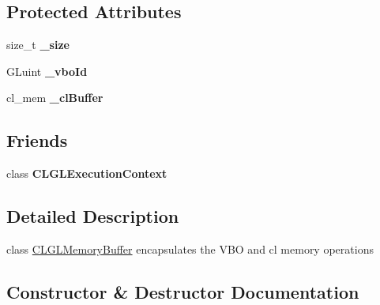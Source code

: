 \subsection*{Protected Attributes}
\begin{DoxyCompactItemize}
\item 
size\+\_\+t {\bfseries \+\_\+size}\hypertarget{class_c_l_ray_tracer_1_1_c_l_g_l_interop_1_1_c_l_g_l_memory_buffer_aaf133114e332eb6d7b5ada43e8e0edea}{}\label{class_c_l_ray_tracer_1_1_c_l_g_l_interop_1_1_c_l_g_l_memory_buffer_aaf133114e332eb6d7b5ada43e8e0edea}

\item 
G\+Luint {\bfseries \+\_\+vbo\+Id}\hypertarget{class_c_l_ray_tracer_1_1_c_l_g_l_interop_1_1_c_l_g_l_memory_buffer_a78b6c593dd1aa2f215da7671d3960c3b}{}\label{class_c_l_ray_tracer_1_1_c_l_g_l_interop_1_1_c_l_g_l_memory_buffer_a78b6c593dd1aa2f215da7671d3960c3b}

\item 
cl\+\_\+mem {\bfseries \+\_\+cl\+Buffer}\hypertarget{class_c_l_ray_tracer_1_1_c_l_g_l_interop_1_1_c_l_g_l_memory_buffer_a6a8c999b4e44b02afdadfa1782902ef7}{}\label{class_c_l_ray_tracer_1_1_c_l_g_l_interop_1_1_c_l_g_l_memory_buffer_a6a8c999b4e44b02afdadfa1782902ef7}

\end{DoxyCompactItemize}
\subsection*{Friends}
\begin{DoxyCompactItemize}
\item 
class {\bfseries C\+L\+G\+L\+Execution\+Context}\hypertarget{class_c_l_ray_tracer_1_1_c_l_g_l_interop_1_1_c_l_g_l_memory_buffer_a3ec7ab73a14f35286e64dee51678d3b6}{}\label{class_c_l_ray_tracer_1_1_c_l_g_l_interop_1_1_c_l_g_l_memory_buffer_a3ec7ab73a14f35286e64dee51678d3b6}

\end{DoxyCompactItemize}


\subsection{Detailed Description}
class \hyperlink{class_c_l_ray_tracer_1_1_c_l_g_l_interop_1_1_c_l_g_l_memory_buffer}{C\+L\+G\+L\+Memory\+Buffer} encapsulates the V\+BO and cl memory operations 

\subsection{Constructor \& Destructor Documentation}

